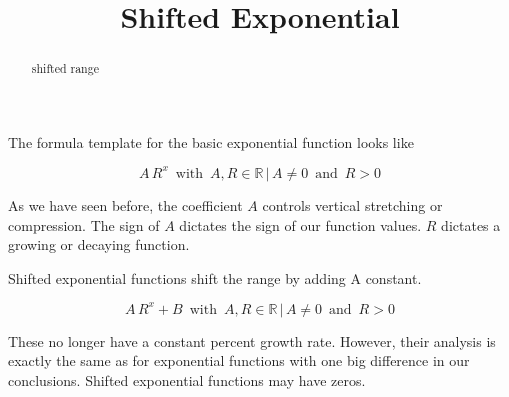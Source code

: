 \documentclass{ximera}
\title{Shifted Exponential}
\begin{document}
\begin{abstract}
shifted range
\end{abstract}
\maketitle




The formula template for the basic exponential function looks like




\[  A \, R^x   \, \text{ with } \,  A, R \in \mathbb{R} \, | \,  A \ne 0 \, \text{ and } \, R > 0   \]


As we have seen before, the coefficient $A$ controls vertical stretching or compression. The sign of $A$ dictates the sign of our function values. $R$ dictates a growing or decaying function.


Shifted exponential functions shift the range by adding A constant. 


\[  A \, R^x  + B \, \text{ with } \,  A, R \in \mathbb{R} \, | \,  A \ne 0 \, \text{ and } \, R > 0   \]




These no longer have a constant percent growth rate.  However, their analysis is exactly the same as for exponential functions with one big difference in our conclusions. Shifted exponential functions may have zeros. 
\end{document}

